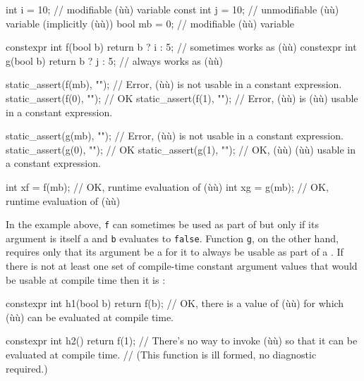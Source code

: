 \begin{emcppslisting}[emcppsbatch=e5]
      int  i = 10;  // modifiable (ù{}ù) variable
const int  j = 10;  // unmodifiable (ù{}ù) variable (implicitly (ù{}ù))
      bool mb = 0;  // modifiable (ù{}ù) variable

constexpr int f(bool b) { return b ? i : 5; }  // sometimes works as (ù{}ù)
constexpr int g(bool b) { return b ? j : 5; }  //    always works as (ù{}ù)

static_assert(f(mb), "");  // Error, (ù{}ù) is not usable in a constant expression.
static_assert(f(0),  "");  // OK
static_assert(f(1),  "");  // Error, (ù{}ù) is (ù{}ù) usable in a constant expression.

static_assert(g(mb), "");  // Error, (ù{}ù) is not usable in a constant expression.
static_assert(g(0),  "");  // OK
static_assert(g(1),  "");  // OK, (ù{}ù) (ù{}ù) usable in a constant expression.

int xf = f(mb);  // OK, runtime evaluation of (ù{}ù)
int xg = g(mb);  // OK, runtime evaluation of (ù{}ù)
\end{emcppslisting}
    

\noindent In the example above, \lstinline!f! can sometimes be used as part of
 but only if its argument is itself a
 and \lstinline!b! evaluates to \lstinline!false!.
Function \lstinline!g!, on the other hand, requires only that its argument
be a  for it to always be usable as part of
a . If there is not at least one set of
compile-time constant argument values that would be usable at compile
time then it is :

\begin{emcppslisting}[emcppsbatch=e5]
constexpr int h1(bool b) { return f(b); }
    // OK, there is a value of (ù{}ù) for which (ù{}ù) can be evaluated at compile time.

constexpr int h2() { return f(1); }
    // There's no way to invoke (ù{}ù) so that it can be evaluated at compile time.
    // (This function is ill formed, no diagnostic required.)
\end{emcppslisting}
    

